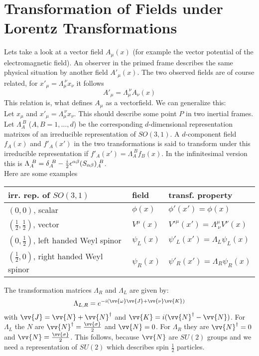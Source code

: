 \section{Transformation of Fields under Lorentz Transformations}
Lets take a look at a vector field $A_\mu(x)$ (for example the vector potential of the electromagnetic field). An observer in the primed frame describes the same physical situation by another field $A'_\mu(x)$. The two observed fields are of course related, for $x'_\mu = \Lambda_\mu^{~\nu}x_\nu$ it follows
\[A'_\mu = \Lambda_\mu^{~\nu}A_\nu(x)\]
This relation is, what defines $A_\mu$ as a vectorfield. We can generalize this:\\
Let $x_\mu$ and $x'_\mu = \Lambda_\mu^{~\nu} x_\nu$. This should describe some point $P$ in two inertial frames. Let $\Lambda_A^{~B}$ ($A,B = 1, \ldots, d$) be the corresponding $d$-dimensional representation matrixes of an irreducible representation of $SO(3,1)$. A $d$-component field $f_A(x)$ and $f'_A(x')$ in the two transformations is said to transform under this irreducible representation if $f'_A(x') = \Lambda_A^{~B} f_B(x)$. In the infinitesimal version this is $\Lambda_A^{~B} = \delta_A^{~B} - \frac{i}{2} \epsilon^{\alpha \beta}(S_{\alpha\beta})_A^{~B}$.\\
Here are some examples
\begin{table}[H]
\begin{tabular}{lll}
irr. rep. of $SO(3,1)$ & field & transf. property\\
\midrule
$\left(0, 0\right)$, scalar & $\phi(x)$ & $\phi'(x') = \phi(x)$\\
$\left(\frac{1}{2}, \frac{1}{2}\right)$, vector & $V^\mu(x)$ & $V'^\mu(x') = \Lambda^\mu_{~\nu}V^\nu(x)$\\
$\left(0,\frac{1}{2}\right)$, left handed Weyl spinor & $\psi_L(x)$ & $\psi'_L(x') = \Lambda_L \psi_L(x)$\\
$\left(\frac{1}{2}, 0 \right)$, right handed Weyl spinor & $\psi_R(x)$ & $\psi'_R(x') = \Lambda_R \psi_R(x)$\\
\end{tabular}
\end{table}
The transformation matrices $\Lambda_R$ and $\Lambda_L$ are given by:
\[\Lambda_{L,R} = e^{-i(\vv{\omega}\vv{J} + \vv{\nu}\vv{K})}\]
with $\vv{J} = \vv{N} + \vv{N}^\dagger$ and $\vv{K} = i (\vv{N}^\dagger - \vv{N})$. For $\Lambda_L$ the $N$ are $\vv{N}^\dagger = \frac{\vv{\sigma}}{2}$ and $\vv{N} = 0$. For $\Lambda_R$ they are $\vv{N}^\dagger = 0$ and $\vv{N} = \frac{\vv{\sigma}}{2}$. This follows, because $\vv{N}$ are $SU(2)$ groups and we need a representation of $SU(2)$ which describes spin $\frac{1}{2}$ particles.\\
